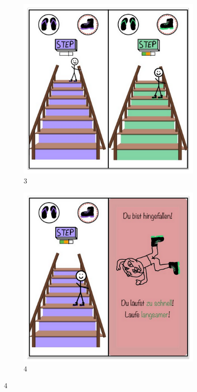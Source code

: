 \documentclass{article}
\begin{document}
\begin{figure}[H]
    \vspace{0.5cm}

    \begin{subfigure}[t]{0.45\textwidth}
        \centering
        \includegraphics[width=\textwidth]{./resources/StairMaster_3.png}
        \caption{3}
    \end{subfigure}
    \hfill
    \begin{subfigure}[t]{0.45\textwidth}
        \centering
        \includegraphics[width=\textwidth]{./resources/StairMaster_4.png}
        \caption{4}
    \end{subfigure}


\end{figure}
\end{document}
